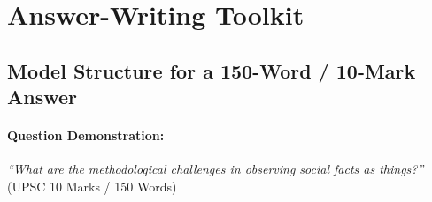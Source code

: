 \sectiondivider

\section{Answer-Writing Toolkit}

\subsection{Model Structure for a 150-Word / 10-Mark Answer}

\paragraph{Question Demonstration:} \textit{``What are the methodological challenges in observing social facts as things?''} (UPSC 10 Marks / 150 Words) 

